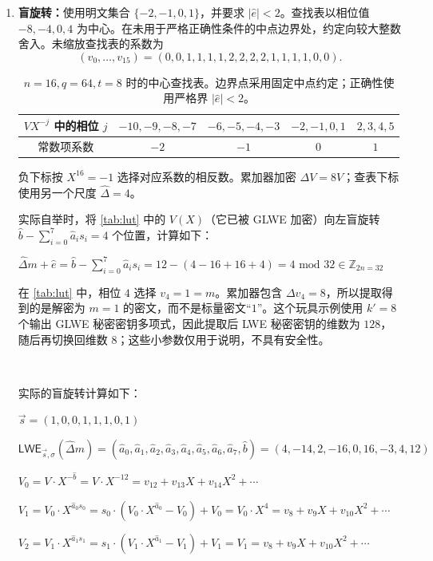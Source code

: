\begin{enumerate}
\item \textbf{盲旋转：}使用明文集合 $\{-2,-1,0,1\}$，并要求 $|\hat e|<2$。查找表以相位值 $-8,-4,0,4$ 为中心。在未用于严格正确性条件的中点边界处，约定向较大整数舍入。未缩放查找表的系数为
\[
(v_0,\ldots,v_{15})=(0,0,1,1,1,1,2,2,2,2,1,1,1,1,0,0).
\]
\begin{table}[h]
\centering
\begin{tabular}{c|c|c|c|c}
\hline
$V X^{-j}$ 中的相位 $j$ & $-10,-9,-8,-7$ & $-6,-5,-4,-3$ & $-2,-1,0,1$ & $2,3,4,5$\\
\hline
常数项系数 & $-2$ & $-1$ & $0$ & $1$\\
\hline
\end{tabular}
\caption{$n=16,q=64,t=8$ 时的中心查找表。边界点采用固定中点约定；正确性使用严格界 $|\hat e|<2$。}
\label{tab:lut}
\end{table}
负下标按 $X^{16}=-1$ 选择对应系数的相反数。累加器加密 $\Delta V=8V$；查表下标使用另一个尺度 $\hat\Delta=4$。

实际自举时，将 \autoref{tab:lut} 中的 $V(X)$（它已被 GLWE 加密）向左盲旋转 $\hat{b} - \sum\limits_{i=0}^{7}\hat{a}_is_i = 4$ 个位置，计算如下：

$\hat\Delta m + \hat e = \hat{b} - \sum\limits_{i=0}^{7}\hat{a}_is_i = 12 - (4 - 16 + 16 + 4) = 4 \text{ mod 32} \in \mathbb{Z}_{2n=32}$ 


在 \autoref{tab:lut} 中，相位 $4$ 选择 $v_4=1=m$。累加器包含 $\Delta v_4=8$，所以提取得到的是解密为 $m=1$ 的密文，而不是标量密文“$1$”。这个玩具示例使用 $k'=8$ 个输出 GLWE 秘密密钥多项式，因此提取后 LWE 秘密密钥的维数为 $128$，随后再切换回维数 $8$；这些小参数仅用于说明，不具有安全性。



$ $

实际的盲旋转计算如下：

$\vec{s} = (1, 0, 0, 1, 1, 1, 0, 1)$

$\textsf{LWE}_{\vec{s}, \sigma}(\hat{\Delta}m) = (\hat{a}_0, \hat{a}_1, \hat{a}_2, \hat{a}_3, \hat{a}_4, \hat{a}_5, \hat{a}_6, \hat{a}_7, \hat{b}) =  (4, -14, 2, -16, 0, 16, -3, 4, 12)$

$V_0 = V \cdot X^{-\hat{b}} = V \cdot X^{-12} = v_{12} + v_{13}X + v_{14}X^2 + \cdots $

$V_1 = V_0 \cdot X^{\hat{a}_0s_0} = s_0 \cdot (V_0 \cdot X^{\hat{a}_0} - V_0) + V_0 = V_0 \cdot X^{4} = v_{8} + v_{9}X + v_{10}X^2 + \cdots$ 

$V_2 = V_1 \cdot X^{\hat{a}_1s_1} = s_1 \cdot (V_1 \cdot X^{\hat{a}_1} - V_1) + V_1 = V_1 = v_{8} + v_{9}X + v_{10}X^2 + \cdots$


\end{enumerate}
